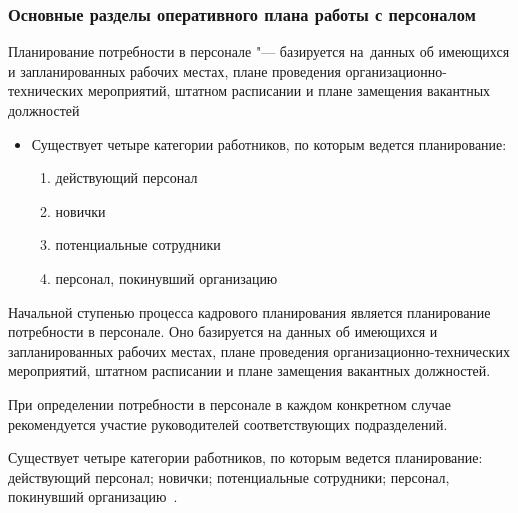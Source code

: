 \documentclass{../industrial-development}
\begin{document}
\begin{frame} \frametitle{Основные разделы оперативного плана работы с персоналом}
\alert{Планирование потребности в персонале} "--- базируется на~данных об имеющихся и запланированных рабочих местах, плане проведения организационно-технических мероприятий, штатном расписании и плане замещения вакантных должностей
  \begin{itemize}
	\item Существует четыре категории работников, по которым ведется планирование:
	  \begin{enumerate}
	\item	действующий персонал
	\item	новички
	\item	потенциальные сотрудники
	\item	персонал, покинувший организацию
	  \end{enumerate}
	  \end{itemize}
\end{frame}

\lecturenotes

Начальной ступенью процесса кадрового планирования является планирование потребности в персонале. Оно базируется на данных об имеющихся и запланированных рабочих местах, плане проведения организационно-технических мероприятий, штатном расписании и плане замещения вакантных должностей.

При определении потребности в персонале в каждом конкретном случае рекомендуется участие руководителей соответствующих подразделений.

Существует четыре категории работников, по которым ведется планирование: действующий персонал; новички; потенциальные сотрудники; персонал, покинувший организацию~\cite[с.~88]{Ivanova}.
\end{document}
